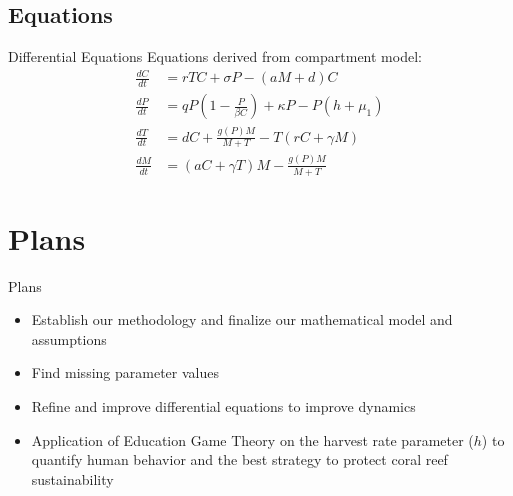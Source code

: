 \documentclass{beamer}
\begin{document}
\subsection{Equations}
\begin{frame}{Differential Equations}
    Equations derived from compartment model:
    \begin{align*}
        \frac{dC}{dt} &= rTC + \sigma P- (aM+d)C\\
        \frac{dP}{dt} &= qP \left( 1-\frac{P}{\beta C} \right) + \kappa P - P \left( h+\mu_{1} \right)\\
        \frac{dT}{dt} &= dC + \frac{g(P)M}{M+T} - T(rC+\gamma M)\\
        \frac{dM}{dt} &= (aC+ \gamma T)M - \frac{g(P)M}{M+T}
    \end{align*}
\end{frame}


\section{Plans}
\begin{frame}{Plans}
    \begin{itemize}
        \item Establish our methodology and finalize our mathematical model and assumptions
        \item Find missing parameter values
        \item Refine and improve differential equations to improve dynamics
        \item Application of Education Game Theory on the harvest rate parameter ($h$) to quantify human behavior and the best strategy to protect coral reef sustainability
    \end{itemize}
\end{frame}
\end{document}
